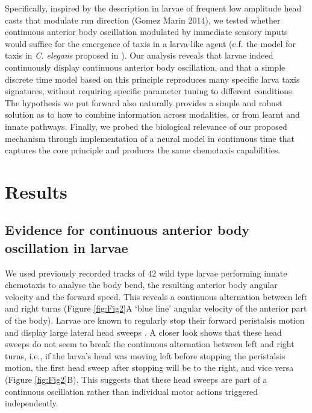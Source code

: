 \documentclass[10pt,a4paper]{article}
\begin{document}
Specifically, inspired by the description in larvae of frequent low amplitude head casts that modulate run direction (Gomez Marin 2014), we tested whether continuous anterior body oscillation modulated by immediate sensory inputs would suffice for the emergence of taxis in a larva-like agent (c.f. the model for taxis in {\it C. elegans} proposed in \citet{izquierdo2010evolution}). Our analysis reveals that larvae indeed continuously display continuous anterior body oscillation, and that a simple discrete time model based on this principle reproduces many specific larva taxis signatures, without requiring specific parameter tuning to different conditions. The hypothesis we put forward also naturally provides a simple and robust solution as to how to combine information across modalities, or from learnt and innate pathways. Finally, we probed the biological relevance of our proposed mechanism through implementation of a neural model in continuous time that captures the core principle and produces the same chemotaxis capabilities.

\section{Results}
\subsection{Evidence for continuous anterior body oscillation in larvae}
 We used previously recorded tracks of 42 wild type larvae performing innate chemotaxis \citep{gomez2012active} to analyse the body bend, the resulting anterior body angular velocity and the forward speed. This reveals a continuous alternation between left and right turns (Figure \ref{fig:Fig2}A ‘blue line’ angular velocity of the anterior part of the body). Larvae are known to regularly stop their forward peristalsis motion and display large lateral head sweeps \citep{gomez2011active}. A closer look 
 shows that these head sweeps do not seem to break the continuous alternation between left and right turns, i.e., if the larva’s head was moving left before stopping the peristalsis motion, the first head sweep after stopping will be to the right, and vice versa (Figure \ref{fig:Fig2}B). This suggests that these head sweeps are part of a continuous oscillation rather than individual motor actions triggered independently.
\end{document}
